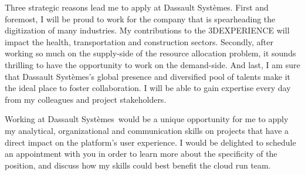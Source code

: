 \documentclass[11pt, a4paper]{awesome-cv}
\newcommand{\company}{Dassault Systèmes}
\begin{document}
\begin{cvletter}
Three strategic reasons lead me to apply at \company.    
First and foremost, I will be proud to work for the company that is spearheading the digitization of many industries. My contributions to the 3DEXPERIENCE will impact the health, transportation and construction sectors.  
Secondly, after working so much on the supply-side of the resource allocation problem, it sounds thrilling to have the opportunity to work on the demand-side.  
And last, I am sure that \company's global presence and diversified pool of talents make it the ideal place to foster collaboration. I will be able to gain expertise every day from my colleagues and project stakeholders. 

Working at \company~would be a unique opportunity for me to apply my analytical, organizational and communication skills on projects that have a direct impact on the platform's user experience.  
I would be delighted to schedule an appointment with you in order to learn more about the specificity of the position, and discuss how my skills could best benefit the cloud run team.  
\end{cvletter}


\makeletterclosing
\end{document}
